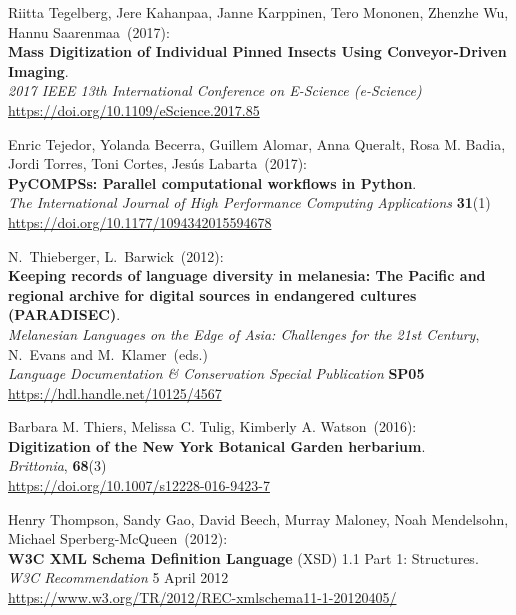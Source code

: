 \begin{thebibliography}{9}
Riitta Tegelberg, Jere Kahanpaa, Janne Karppinen, Tero Mononen, Zhenzhe Wu, Hannu Saarenmaa~(2017): \\
\textbf{Mass Digitization of Individual Pinned Insects Using Conveyor-Driven Imaging}.\\
\emph{2017 IEEE 13th International Conference on E-Science (e-Science)}\\
\url{https://doi.org/10.1109/eScience.2017.85}

Enric Tejedor, Yolanda Becerra, Guillem Alomar, Anna Queralt,
Rosa M. Badia, Jordi Torres, Toni Cortes, Jesús Labarta~(2017): \\
\textbf{PyCOMPSs: Parallel computational workflows in Python}.\\
\emph{The International Journal of High Performance Computing Applications}
\textbf{31}(1) \\
\url{https://doi.org/10.1177/1094342015594678}

N.~Thieberger, L.~Barwick~(2012): \\
\textbf{Keeping records of language diversity in melanesia: The Pacific
and regional archive for digital sources in endangered cultures
(PARADISEC)}.\\
\emph{Melanesian Languages on the Edge of Asia:
Challenges for the 21st Century}, N.~Evans and M.~Klamer~(eds.)\\
\emph{Language Documentation \& Conservation Special Publication}
\textbf{SP05} \\
\url{https://hdl.handle.net/10125/4567}

Barbara M. Thiers, Melissa C. Tulig, Kimberly A. Watson~(2016): \\
\textbf{Digitization of the New York Botanical Garden herbarium}.\\
\emph{Brittonia}, \textbf{68}(3)\\
\url{https://doi.org/10.1007/s12228-016-9423-7}


Henry Thompson, Sandy Gao, David Beech, Murray Maloney, Noah Mendelsohn, Michael Sperberg-McQueen~(2012): \\
\textbf{W3C XML Schema Definition Language} ({XSD}) 1.1 {Part} 1: {Structures}. \\
\emph{W3C Recommendation} 5 April 2012 \\
\url{https://www.w3.org/TR/2012/REC-xmlschema11-1-20120405/}


\end{thebibliography}

